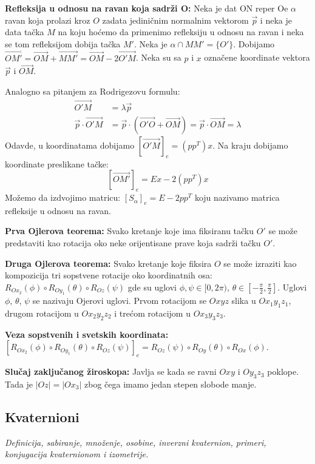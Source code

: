 \documentclass[12pt]{article}
\newcommand{\vek}[1]{\overrightarrow{#1}}
\begin{document}
\textbf{Refleksija u odnosu na ravan koja sadrži O:} Neka je dat ON reper Oe
$\alpha$ ravan koja prolazi kroz $O$ zadata jediničnim normalnim vektorom
$\vek{p}$ i neka je data tačka $M$ na koju hoćemo da primenimo refleksiju u
odnosu na ravan i neka se tom refleksijom dobija tačka $M'$. Neka je
$\alpha\cap MM'=\{O'\}$. Dobijamo
$\vek{OM'}=\vek{OM}+\vek{MM'}=\vek{OM}-2\vek{O'M}$. Neka su sa $p$ i $x$
označene koordinate vektora $\vek{p}$ i $\vek{OM}$.

Analogno sa pitanjem za Rodrigezovu formulu:
\begin{align*}
    \vek{O'M}             & =\lambda\vek{p}                                                \\
    \vek{p}\cdot\vek{O'M} & =\vek{p}\cdot(\vek{O'O}+\vek{OM})=\vek{p}\cdot\vek{OM}=\lambda
\end{align*}
Odavde, u koordinatama dobijamo $[\vek{O'M}]_e=(pp^T)x$. Na kraju dobijamo
koordinate preslikane tačke:
$$[\vek{OM'}]_e=Ex-2(pp^T)x$$
Možemo da izdvojimo matricu: $[S_\alpha]_e=E-2pp^T$ koju nazivamo matrica
refleksije u odnosu na ravan.
\par

\textbf{Prva Ojlerova teorema:} Svako kretanje koje ima fiksiranu tačku
$O'$ se može predstaviti kao rotacija oko neke orijentisane
prave koja sadrži tačku $O'$.
\par

\textbf{Druga Ojlerova teorema:} Svako kretanje koje fiksira $O$ se može
izraziti kao kompozicija tri sopstvene rotacije oko koordinatnih osa:
$R_{Ox_2}(\phi)\circ R_{Oy_1}(\theta)\circ R_{Oz}(\psi)$ gde su uglovi
$\phi,\psi\in[0,2\pi)$, $\theta\in[-\frac{\pi}{2},\frac{\pi}{2}]$. Uglovi $\phi$,
$\theta$, $\psi$ se nazivaju Ojerovi uglovi. Prvom rotacijom se $Oxyz$ slika u
$Ox_1y_1z_1$, drugom rotacijom u $Ox_2y_2z_2$ i trećom rotacijom u $Ox_3y_3z_3$.
\par

\textbf{Veza sopstvenih i svetskih koordinata:}
$[R_{Ox_2}(\phi)\circ R_{Oy_1}(\theta)\circ R_{Oz}(\psi)]_e=R_{Oz}(\psi)\circ R_{Oy}(\theta)\circ R_{Ox}(\phi)$.
\par

\textbf{Slučaj zaključanog žiroskopa:} Javlja se kada se ravni
$Oxy$ i $Oy_3z_3$ poklope. Tada je $|Oz|=|Ox_3|$ zbog čega imamo jedan stepen slobode manje.

\subsection{Kvaternioni}
\textit{Definicija, sabiranje, množenje, osobine, inverzni
    kvaternion, primeri, konjugacija kvaternionom i izometrije.}
\par
\vspace*{1cm}
\end{document}
